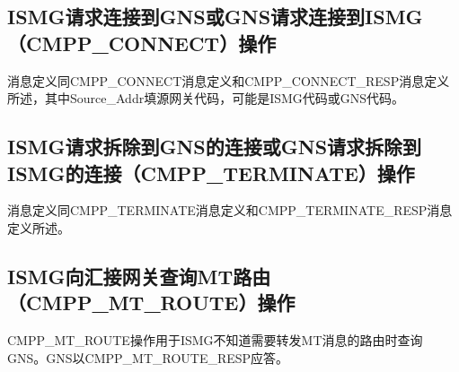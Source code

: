 \documentclass[11pt]{book} %
\begin{document}
\subsection{ISMG请求连接到GNS或GNS请求连接到ISMG（CMPP\_CONNECT）操作}


消息定义同CMPP\_CONNECT消息定义和CMPP\_CONNECT\_RESP消息定义所述，其中Source\_Addr填源网关代码，可能是ISMG代码或GNS代码。


%
%
%
%
%



\subsection{ISMG请求拆除到GNS的连接或GNS请求拆除到ISMG的连接（CMPP\_TERMINATE）操作}


消息定义同CMPP­\_TERMINATE消息定义和CMPP­\_TERMINATE\_RESP消息定义所述。


%
%
%
%
%



\subsection{ISMG向汇接网关查询MT路由（CMPP\_MT\_ROUTE）操作}

CMPP\_MT\_ROUTE操作用于ISMG不知道需要转发MT消息的路由时查询GNS。GNS以CMPP\_MT\_ROUTE\_RESP应答。

%
%
%
%
%
\end{document}
